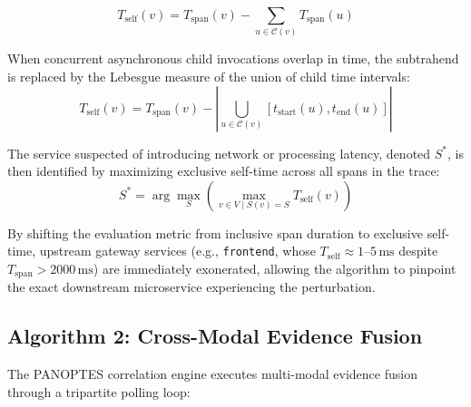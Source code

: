 \begin{equation}
    T_{\text{self}}(v) = T_{\text{span}}(v) - \sum_{u \in \mathcal{C}(v)} T_{\text{span}}(u)
    \label{eq:selftime}
\end{equation}

When concurrent asynchronous child invocations overlap in time, the subtrahend is replaced by the Lebesgue measure of the union of child time intervals:
\begin{equation}
    T_{\text{self}}(v) = T_{\text{span}}(v) - \left| \bigcup_{u \in \mathcal{C}(v)} [t_{\text{start}}(u), t_{\text{end}}(u)] \right|
\end{equation}

The service suspected of introducing network or processing latency, denoted $S^*$, is then identified by maximizing exclusive self-time across all spans in the trace:
\begin{equation}
    S^* = \arg\max_{S} \left( \max_{v \in V \mid S(v) = S} T_{\text{self}}(v) \right)
\end{equation}

By shifting the evaluation metric from inclusive span duration to exclusive self-time, upstream gateway services (e.g., \texttt{frontend}, whose $T_{\text{self}} \approx 1\text{--}5\,\text{ms}$ despite $T_{\text{span}} > 2000\,\text{ms}$) are immediately exonerated, allowing the algorithm to pinpoint the exact downstream microservice experiencing the perturbation.

\subsection{Algorithm 2: Cross-Modal Evidence Fusion}
The PANOPTES correlation engine executes multi-modal evidence fusion through a tripartite polling loop:

